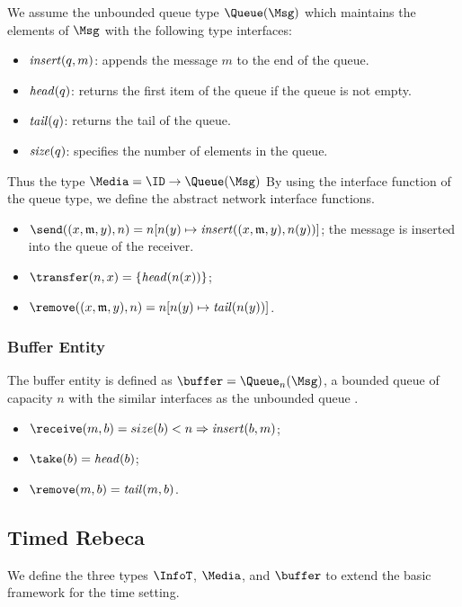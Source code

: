 We assume the unbounded queue type $\Queue(\Msg)$ which maintains the elements of $\Msg$ with the following type interfaces: 
\begin{itemize}
    \item ${\it insert}(q,m)$: appends the message $m$ to the end of the queue. 
    \item ${\it head}(q)$: returns the first item of the queue if the queue is not empty.
    \item ${\it tail}(q)$: returns the tail of the queue.
    \item ${\it size}(q)$: specifies the number of elements in the queue.
    
\end{itemize}

Thus the type $\Media=\ID\rightarrow \Queue(\Msg)$ By using the interface function of the queue type, we define the abstract network interface functions.
\begin{itemize}
	\item $\send((x,\mathfrak{m},y),n)=n[n(y)\mapsto{\it insert}((x,\mathfrak{m},y),n(y))] $; the message is inserted into the queue of the receiver.
	\item $\transfer(n,x)=\{{\it head}(n(x))\}$;
	\item $\remove((x,\mathfrak{m},y),n)=n[n(y)\mapsto{\it tail}(n(y))]$.
\end{itemize}  

\subsubsection{Buffer Entity}\label{classic::buffer}
The buffer entity is defined as $\buffer= \Queue_n(\Msg)$, a bounded queue of capacity $n$ with the similar interfaces as the unbounded queue .  

\begin{itemize}
\item $\receive(m,b)={size(b)<n}\Rightarrow {\it insert}(b,m) $;
\item $\take(b)={\it head}(b)$;
\item $\remove(m,b)={\it tail}(m,b)$.
\end{itemize} 

\subsection{Timed Rebeca}
We define the three types $\InfoT$, $\Media$, and $\buffer$ to extend the basic framework for the time setting.

